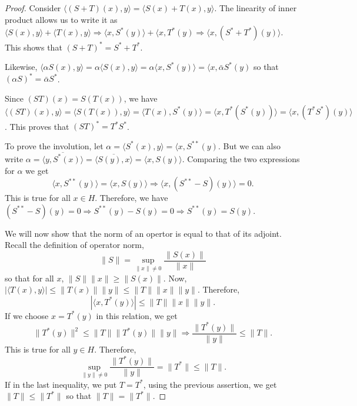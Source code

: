 \documentclass{article}
\theoremstyle{plain}
\numberwithin{thm}{section}
\theoremstyle{plain}
\numberwithin{prop}{section}
\theoremstyle{definition}
\numberwithin{defn}{section}
\theoremstyle{remark}
\numberwithin{equation}{section}
\begin{document}
\begin{proof}
Consider $\langle (S + T)(x), y \rangle = \langle S(x) + T(x), y\rangle$. The
linearity of inner product allows us to write it as $\langle S(x), y\rangle +
\langle T(x), y\rangle \Rightarrow \langle x, S^\ast(y)\rangle + \langle x, 
T^\ast(y) \Rightarrow \langle x, (S^\ast + T^\ast)(y)\rangle$. This shows that
$(S + T)^\ast = S^\ast + T^\ast$.

Likewise, $\langle \alpha S(x), y\rangle = \alpha\langle S(x), y\rangle =
\alpha\langle x, S^\ast(y)\rangle = \langle x, \bar{\alpha}S^\ast(y)$ so that
$(\alpha S)^\ast = \bar{\alpha}S^\ast$.

Since $(ST)(x) = S(T(x))$, we have $\langle (ST)(x), y\rangle = \langle S(T(x)),
y\rangle = \langle T(x), S^\ast(y)\rangle = \langle x, T^\ast(S^\ast(y))\rangle
= \langle x, (T^\ast S^\ast)(y)\rangle$. This proves that $(ST)^\ast = T^\ast
S^\ast$.

To prove the involution, let $\alpha = \langle S^\ast(x), y\rangle = \langle
x, S^{\ast\ast}(y)$. But we can also write $\alpha = \overline{\langle y, 
S^\ast(x)\rangle} = \overline{\langle S(y), x\rangle} = \langle x, S(y)\rangle$.
Comparing the two expressions for $\alpha$ we get
\[
\langle x, S^{\ast\ast}(y)\rangle = \langle x, S(y)\rangle \Rightarrow
\langle x, (S^{\ast\ast} - S)(y)\rangle = 0.
\]
This is true for all $x \in H$. Therefore, we have $(S^{\ast\ast} - S)(y) = 0
\Rightarrow S^{\ast\ast}(y) - S(y) = 0 \Rightarrow S^{\ast\ast}(y) = S(y)$.

We will now show that the norm of an opertor is equal to that of its adjoint.
Recall the definition of operator norm,
\[
\lVert S\rVert = \sup_{\lVert x \rVert \ne 0}\frac{\lVert S(x)\rVert}{\lVert x
\rVert}
\]
so that for all $x$, $\lVert S\rVert\lVert x \rVert \ge \lVert S(x)\rVert$.
Now, $|\langle T(x), y\rangle| \le \lVert T(x)\rVert\lVert y\rVert \le \lVert
T\rVert\lVert x \rVert\lVert y \rVert$. Therefore, 
\[
|\langle x, T^\ast(y)\rangle| \le \lVert T\rVert\lVert x\rVert\lVert y\rVert.
\]
If we choose $x = T^\ast(y)$ in this relation, we get
\[
\lVert T^\ast(y)\rVert^2 \le \lVert T\rVert\lVert T^\ast(y)\rVert\lVert y\rVert
\Rightarrow \frac{\lVert T^\ast(y)\rVert}{\lVert y \rVert} \le \lVert T\rVert.
\]
This is true for all $y \in H$. Therefore,
\[
\sup_{\lVert y \rVert \ne 0}\frac{\lVert T^\ast(y)\rVert}{\lVert y \rVert} =
\lVert T^\ast\rVert \le \lVert T\rVert.
\]
If in the last inequality, we put $T = T^\ast$, using the previous assertion, we
get $\lVert T\rVert \le \lVert T^\ast\rVert$ so that $\lVert T \rVert = \lVert
T^\ast \rVert$.
\end{proof}
\end{document}
